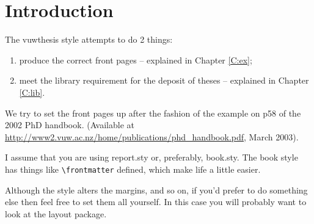 \chapter{Introduction}\label{C:intro}
The \textsf{vuwthesis} style attempts to do 2 things:
\begin{enumerate}
\item produce the correct front pages -- explained in Chapter \ref{C:ex};
\item meet the library requirement for the deposit of theses -- explained in Chapter \ref{C:lib}.
\end{enumerate}

We try to set the front pages up after the fashion of the example on p58
of the 2002 PhD handbook. (Available at
\url{http://www2.vuw.ac.nz/home/publications/phd_handbook.pdf}, March
2003).

I assume that you are using \textsf{report.sty} or, preferably,
\textsf{book.sty}. The book style has things like \verb+\frontmatter+
defined, which make life a little easier. 

Although the style alters the margins, and so on,  if you'd prefer to do
something else then feel free to set them all yourself. In this case you
will probably want to look at the \textsf{layout} package.